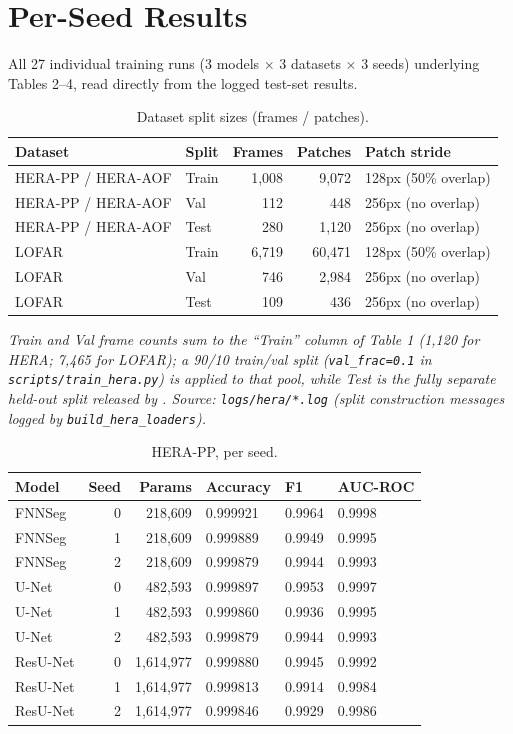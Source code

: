 \documentclass[11pt]{article}
\begin{document}
\section{Per-Seed Results}

All 27 individual training runs (3 models $\times$ 3 datasets $\times$ 3 seeds) underlying Tables 2--4, read directly from the logged test-set results.

\begin{table}[h]
\centering
\caption{Dataset split sizes (frames / patches).}
\begin{tabular}{llrrl}
\toprule
Dataset & Split & Frames & Patches & Patch stride \\
\midrule
HERA-PP / HERA-AOF & Train & 1,008 & 9,072 & 128px (50\% overlap) \\
HERA-PP / HERA-AOF & Val & 112 & 448 & 256px (no overlap) \\
HERA-PP / HERA-AOF & Test & 280 & 1,120 & 256px (no overlap) \\
LOFAR & Train & 6,719 & 60,471 & 128px (50\% overlap) \\
LOFAR & Val & 746 & 2,984 & 256px (no overlap) \\
LOFAR & Test & 109 & 436 & 256px (no overlap) \\
\bottomrule
\end{tabular}
\end{table}

\emph{Train and Val frame counts sum to the ``Train'' column of Table 1 (1,120 for HERA; 7,465 for LOFAR); a 90/10 train/val split (\texttt{val\_frac=0.1} in \texttt{scripts/train\_hera.py}) is applied to that pool, while Test is the fully separate held-out split released by \citet{dutoit2023}. Source: \texttt{logs/hera/*.log} (split construction messages logged by \texttt{build\_hera\_loaders}).}

\begin{table}[h]
\centering
\caption{HERA-PP, per seed.}
\begin{tabular}{lrrlll}
\toprule
Model & Seed & Params & Accuracy & F1 & AUC-ROC \\
\midrule
FNNSeg & 0 & 218,609 & 0.999921 & 0.9964 & 0.9998 \\
FNNSeg & 1 & 218,609 & 0.999889 & 0.9949 & 0.9995 \\
FNNSeg & 2 & 218,609 & 0.999879 & 0.9944 & 0.9993 \\
U-Net & 0 & 482,593 & 0.999897 & 0.9953 & 0.9997 \\
U-Net & 1 & 482,593 & 0.999860 & 0.9936 & 0.9995 \\
U-Net & 2 & 482,593 & 0.999879 & 0.9944 & 0.9993 \\
ResU-Net & 0 & 1,614,977 & 0.999880 & 0.9945 & 0.9992 \\
ResU-Net & 1 & 1,614,977 & 0.999813 & 0.9914 & 0.9984 \\
ResU-Net & 2 & 1,614,977 & 0.999846 & 0.9929 & 0.9986 \\
\bottomrule
\end{tabular}
\end{table}
\end{document}
